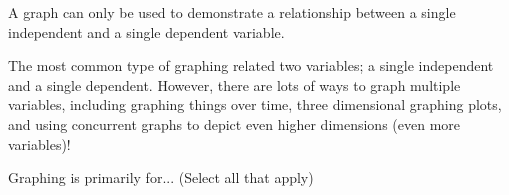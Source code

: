\documentclass{ximera}
\begin{document}
\begin{problem}
    A graph can only be used to demonstrate a relationship between a single independent and a single dependent variable.
    \begin{multipleChoice}
    \end{multipleChoice}
    \begin{feedback}
        The most common type of graphing related two variables; a single independent and a single dependent. However, there are lots of ways to graph multiple variables, including graphing things over time, three dimensional graphing plots, and using concurrent graphs to depict even higher dimensions (even more variables)!
    \end{feedback}
\end{problem}

\begin{problem}
    Graphing is primarily for... (Select all that apply)
    \begin{selectAll}
    \end{selectAll}
\end{problem}
\end{document}
